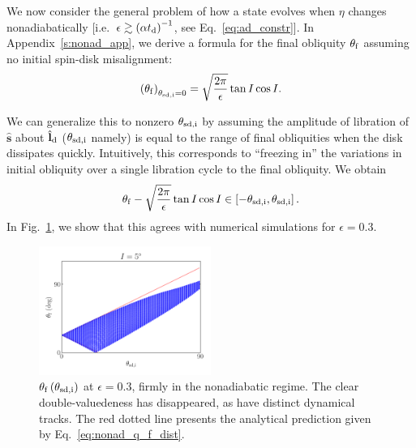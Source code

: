 \documentclass[
        fleqn,
        usenatbib,
    ]{mnras}
\newcommand*{\bm}[1]{\boldsymbol{\mathbf{#1}}}
\newcommand*{\uv}[1]{\hat{\bm{#1}}}
\newcommand*{\p}[1]{\left(#1\right)}
\newcommand*{\s}[1]{\left[#1\right]}
\begin{document}
We now consider the general problem of how a state evolves when $\eta$ changes
nonadiabatically [i.e.\ $\epsilon \gtrsim \p{\alpha t_{\rm d}}^{-1}$, see
Eq.~\eqref{eq:ad_constr}]. In Appendix~\ref{s:nonad_app}, we derive a formula
for the final obliquity $\theta_{\rm f}$ assuming no initial spin-disk
misalignment:
\begin{equation}
    \p{\theta_{\rm f}}_{\theta_{\rm sd, i} = 0} = \sqrt{\frac{2\pi}{\epsilon}} \tan
        I\cos I.\label{eq:nonad_q_f}
\end{equation}

We can generalize this to nonzero $\theta_{\rm sd, i}$ by assuming the amplitude
of libration of $\uv{s}$ about $\uv{l}_{\rm d}$ ($\theta_{\rm sd, i}$ namely)
is equal to the range of final obliquities when the disk dissipates quickly.
Intuitively, this corresponds to ``freezing in'' the variations in initial
obliquity over a single libration cycle to the final obliquity. We obtain
\begin{equation}
    \theta_{\rm f} - \sqrt{\frac{2\pi}{\epsilon}} \tan
        I\cos I\in \s{-\theta_{\rm sd, i}, \theta_{\rm sd,i}}
        .\label{eq:nonad_q_f_dist}
\end{equation}
In Fig.~\ref{fig:nonad_3_ensemeble}, we show that this agrees with numerical
simulations for $\epsilon = 0.3$.
\begin{figure}
    \centering
    \includegraphics[width=0.5\textwidth]{plots_diskdisp/3_ensemble_05_05.png}
    \caption{$\theta_{\rm  f}\p{\theta_{\rm sd, i}}$ at $\epsilon = 0.3$, firmly
    in the nonadiabatic regime. The clear double-valuedeness has disappeared,
    as have distinct dynamical tracks. The red dotted line presents the
    analytical prediction given by
    Eq.~\eqref{eq:nonad_q_f_dist}.}\label{fig:nonad_3_ensemeble}
\end{figure}
\end{document}
